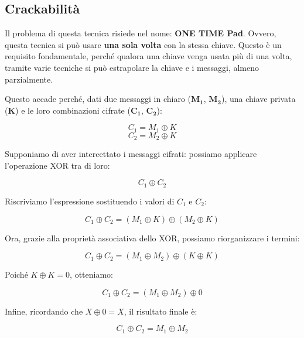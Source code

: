 \documentclass{rapport}
\begin{document}
\subsection{Crackabilità}
Il problema di questa tecnica risiede nel nome: \textbf{ONE TIME Pad}. Ovvero, questa tecnica si può usare \textbf{una sola volta} con la stessa chiave. Questo è un requisito fondamentale, perché qualora una chiave venga usata più di una volta, tramite varie tecniche si può estrapolare la chiave e i messaggi, almeno parzialmente.  

Questo accade perché, dati due messaggi in chiaro (\(\mathbf{M_1}\), \(\mathbf{M_2}\)), una chiave privata (\(\mathbf{K}\)) e le loro combinazioni cifrate (\(\mathbf{C_1}\), \(\mathbf{C_2}\)):  

\begin{equation*}
    C_1 = M_1 \oplus K 
\end{equation*}
\begin{equation*}
    C_2 = M_2 \oplus K    
\end{equation*}

Supponiamo di aver intercettato i messaggi cifrati: possiamo applicare l'operazione XOR tra di loro:  

\begin{equation*}
    C_1 \oplus C_2
\end{equation*}

Riscriviamo l'espressione sostituendo i valori di \(C_1\) e \(C_2\):  

\begin{equation*}
    C_1 \oplus C_2 = (M_1 \oplus K ) \oplus (M_2 \oplus K)
\end{equation*}

Ora, grazie alla proprietà associativa dello XOR, possiamo riorganizzare i termini:  

\begin{equation*}
    C_1 \oplus C_2 = (M_1 \oplus M_2 ) \oplus (K \oplus K)
\end{equation*}

Poiché \(K \oplus K = 0\), otteniamo:  

\begin{equation*}
    C_1 \oplus C_2 = (M_1 \oplus M_2 ) \oplus 0
\end{equation*}

Infine, ricordando che \(X \oplus 0 = X\), il risultato finale è:  

\begin{equation*}
    C_1 \oplus C_2 = M_1 \oplus M_2 
\end{equation*}
\end{document}
